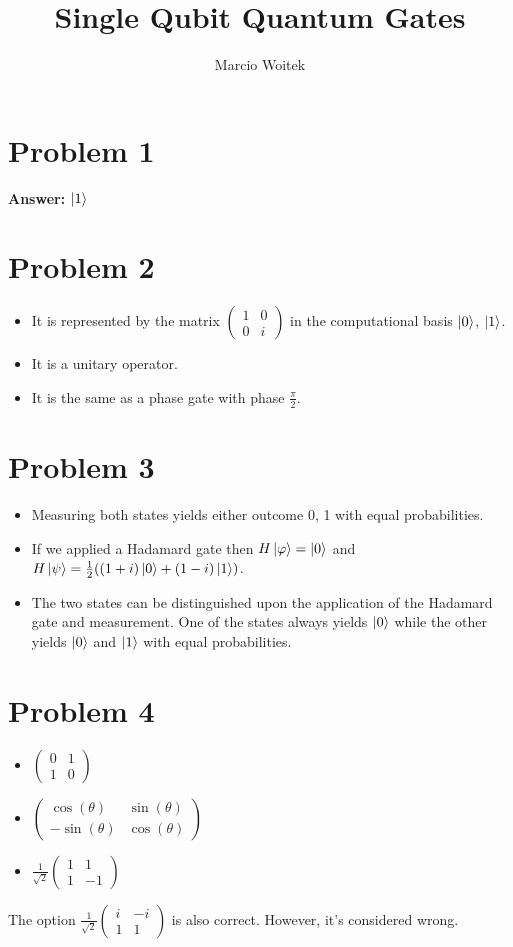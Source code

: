 \documentclass[11pt]{article}
\author{Marcio Woitek}
\date{}
\title{Single Qubit Quantum Gates}
\newcommand{\invroot}[1]{\frac{1}{\sqrt{#1}}}
\begin{document}
\maketitle
\thispagestyle{empty}
\pagestyle{empty}

\newcommand{\twoByTwo}[4]{%
  \begin{pmatrix}
    #1 & #2\\
    #3 & #4
  \end{pmatrix}%
}
\section*{Problem 1}
\label{sec:org8e4de30}
\textbf{Answer:} \(\ket{1}\)
\section*{Problem 2}
\label{sec:org0c047db}
\begin{itemize}
\item It is represented by the matrix \(\twoByTwo{1}{0}{0}{i}\) in the
computational basis \(\ket{0}\), \(\ket{1}\).
\item It is a unitary operator.
\item It is the same as a phase gate with phase \(\frac{\pi}{2}\).
\end{itemize}
\section*{Problem 3}
\label{sec:org4dfdc42}
\begin{itemize}
\item Measuring both states yields either outcome 0, 1 with equal probabilities.
\item If we applied a Hadamard gate then \(H\ket{\varphi}=\ket{0}\) and
\(H\ket{\psi}=\frac{1}{2}((1+i)\ket{0}+(1-i)\ket{1})\).
\item The two states can be distinguished upon the application of the Hadamard gate
and measurement. One of the states always yields \(\ket{0}\) while the other
yields \(\ket{0}\) and \(\ket{1}\) with equal probabilities.
\end{itemize}
\section*{Problem 4}
\label{sec:org165ec98}
\begin{itemize}
\item \(\twoByTwo{0}{1}{1}{0}\)
\item \(\twoByTwo{\cos(\theta)}{\sin(\theta)}{-\sin(\theta)}{\cos(\theta)}\)
\item \(\invroot{2}\twoByTwo{1}{1}{1}{-1}\)\\
\end{itemize}

The option \(\invroot{2}\twoByTwo{i}{-i}{1}{1}\) is also correct. However,
it's considered wrong.
\end{document}
